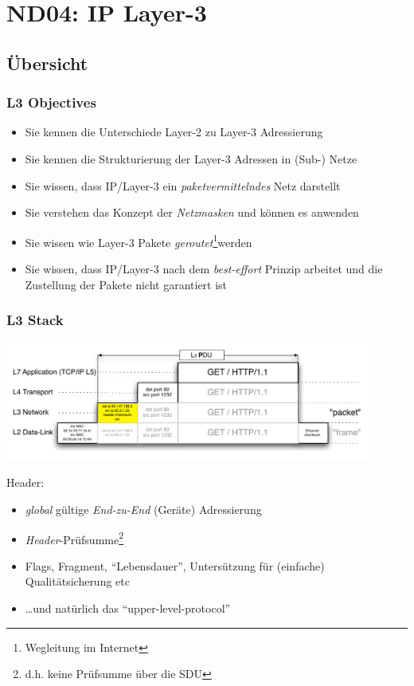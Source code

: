 \documentclass{beamer}
\begin{document}
\section{ND04: IP Layer-3}
\subsection{\"Ubersicht}

\begin{frame}
\frametitle{L3 Objectives}
\begin{itemize}
	\item{Sie kennen die Unterschiede Layer-2 zu Layer-3 Adressierung}
	\item{Sie kennen die Strukturierung der Layer-3 Adressen in (Sub-) Netze}
	\item{Sie wissen, dass IP/Layer-3 ein {\em paketvermittelndes} Netz darstellt}
	\item{Sie verstehen das Konzept der {\em Netzmasken} und k\"onnen es anwenden}
	\item{Sie wissen wie Layer-3 Pakete {\em geroutet}\footnote{Wegleitung im Internet}werden}
	\item{Sie wissen, dass IP/Layer-3 nach dem {\em best-effort} Prinzip arbeitet und die Zustellung der Pakete nicht garantiert ist}
\end{itemize}
\end{frame}


\begin{frame}
\frametitle{L3 Stack}
\includegraphics[width=12cm]{stack-overview-3}

Header:
\begin{itemize}
  \item{\emph{global} g\"ultige \emph{End-zu-End} (Ger\"ate) Adressierung}
  \item{\emph{Header}-Pr\"ufsumme\footnote{d.h. keine Pr\"ufsumme \"uber die SDU}}
  \item{Flags, Fragment, ``Lebensdauer'', Unters\"utzung f\"ur (einfache) Qualit\"atsicherung etc}
  \item{\ldots und nat\"urlich das ``upper-level-protocol''}
\end{itemize}
\end{frame}
\end{document}
